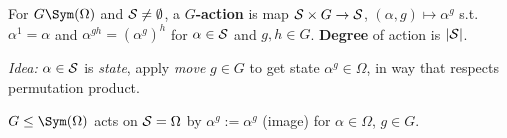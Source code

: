 \begin{slide}
    \begin{definition}
        \vspace{0pt}
        For $G \Sym (\Omega)$ and $\mathcal{S} \neq \emptyset$, a \textbf{$G$-action} is map $\mathcal{S} \times G \to \mathcal{S}$, $(\alpha,g) \mapsto \alpha^g$ s.t. $\alpha^1 = \alpha$ and $\alpha^{gh} = (\alpha^g)^h$ for $\alpha \in \mathcal{S}$ and $g,h \in G$. \textbf{Degree} of action is $|\mathcal{S}|$.
    \end{definition}

    \textit{Idea:} $\alpha \in \mathcal{S}$ is \textit{state}, apply \textit{move} $g \in G$ to get state $\alpha^g \in \Omega$, in way that respects permutation product. \pause

    \begin{example}
        \vspace{0pt}
        $G \leq \Sym(\Omega)$ acts on $\mathcal{S} = \Omega$ by $\alpha^g := \alpha^g$ (image) for $\alpha \in \Omega$, $g \in G$.
    \end{example}

\end{slide}

